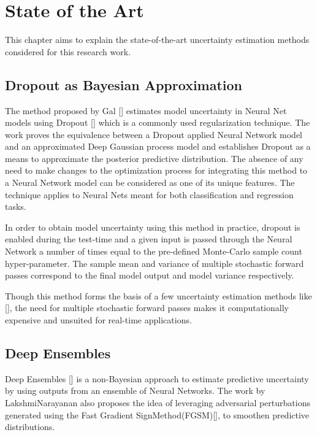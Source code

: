 

    \chapter{State of the Art}\label{chap_state_of_the_art}
	This chapter aims to explain the state-of-the-art uncertainty estimation methods considered for this research work. 
	\section{Dropout as Bayesian Approximation}
	The method proposed by Gal {\etal} [\cite{gal2016dropout}] estimates model uncertainty in Neural Net models using Dropout [\cite{srivastava2014dropout}] which is a commonly used regularization technique. The work proves the equivalence between a Dropout applied Neural Network model and an approximated Deep Gaussian process model and establishes Dropout as a means to approximate the posterior predictive distribution. The absence of any need to make changes to the optimization process for integrating this method to a Neural Network model can be considered as one of its unique features. The technique applies to Neural Nets meant for both classification and regression tasks. 
	
	In order to obtain model uncertainty using this method in practice, dropout is enabled during the test-time and a given input is passed through the Neural Network a number of times equal to the pre-defined Monte-Carlo sample count hyper-parameter. The sample mean and variance of multiple stochastic forward passes correspond to the final model output and model variance respectively. 
	
	Though this method forms the basis of a few uncertainty estimation methods like [\cite{loquercio2020a}], the need for multiple stochastic forward passes makes it computationally expensive and unsuited for real-time applications.
	
	\section{Deep Ensembles}
	  Deep Ensembles [\cite{lakshminarayanan2017simple}] is a non-Bayesian approach to estimate predictive uncertainty by using outputs from an ensemble of Neural Networks. The work by LakshmiNarayanan {\etal}  also proposes the idea of leveraging adversarial perturbations generated using the Fast Gradient SignMethod(FGSM)[\cite{goodfellow2015explaining}], to smoothen predictive distributions.
	  
